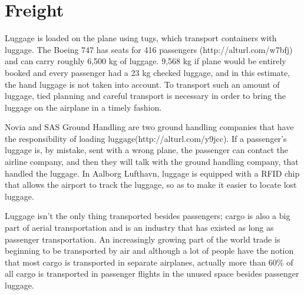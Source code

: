 \section{Freight}
Luggage is loaded on the plane using tugs, which transport containers with luggage. The Boeing 747 has seats for 416 passengers (http://alturl.com/w7bfj) and can carry roughly 6,500 kg of luggage. %
9,568 kg if plane would be entirely booked and every passenger had a 23 kg checked luggage, and in this estimate, the hand luggage is not taken into account. To transport such an amount of luggage, tied planning and careful transport is necessary in order to bring the luggage on the airplane in a timely fashion. %


Novia and SAS Ground Handling are two ground handling companies that have the responsibility of loading luggage(http://alturl.com/y9jcc). If a passenger's luggage is, by mistake, sent with a wrong plane, the passenger can contact the airline company, and then they will talk with the ground handling company, that handled the luggage. In Aalborg Lufthavn, luggage is equipped with a RFID chip that allows the airport to track the luggage, so as to make it easier to locate lost luggage.


Luggage isn't the only thing transported besides passengers; cargo is also a big part of aerial transportation and is an industry that has existed as long as passenger transportation. An increasingly growing part of the world trade is beginning to be transported by air and although a lot of people have the notion that most cargo is transported in separate airplanes, actually more than 60\% of all cargo is transported in passenger flights in the unused space besides passenger luggage.



